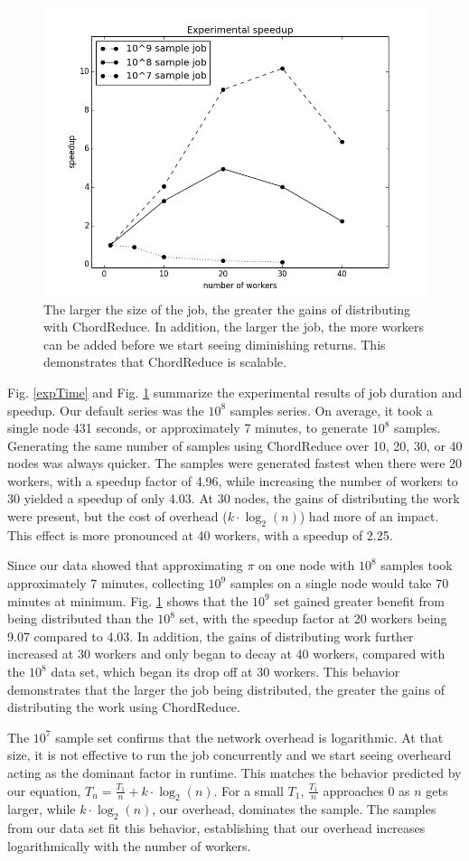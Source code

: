 \begin{figure}
    \includegraphics[width=.5\linewidth]{expSpeed}
    \caption{The larger the size of the job, the greater the gains of distributing with ChordReduce.  In addition, the larger the job, the more workers can be added before we start seeing diminishing returns.  This demonstrates that ChordReduce is scalable.}
    \label{expSpeed}
\end{figure}

Fig. \ref{expTime} and Fig. \ref{expSpeed} summarize the experimental results of job duration and speedup.  Our default series was the $10^{8}$ samples series.  On average, it took a single node 431 seconds, or approximately 7 minutes, to generate $10^{8}$ samples.  Generating the same number of samples using ChordReduce over 10, 20, 30, or 40 nodes was always quicker.  The samples were generated fastest when there were 20 workers, with a speedup factor of 4.96, while increasing the number of workers to 30 yielded a speedup of only 4.03.  At 30 nodes, the gains of distributing the work were present, but the cost of overhead ($k \cdot \log_{2}(n)$) had more of an impact.  This effect is more pronounced at 40 workers, with a speedup of 2.25.

Since our data showed that approximating $\pi$ on one node with $10^{8}$ samples took approximately 7 minutes, collecting $10^{9}$ samples on a single node would take 70 minutes at minimum.  Fig. \ref{expSpeed} shows that the $10^{9}$ set gained greater benefit from being distributed than the $10^{8}$ set, with the speedup factor at 20 workers being 9.07 compared to 4.03.  In addition, the gains of distributing work further increased at 30 workers and only began to decay at 40 workers, compared with the $10^{8}$ data set, which began its drop off at 30 workers. This behavior demonstrates that the larger the job being distributed, the greater the gains of distributing the work using ChordReduce.

The $10^{7}$ sample set confirms that the network overhead is logarithmic.  At that size, it is not effective to run the job concurrently and we start seeing overheard acting as the dominant factor in runtime.  This matches the behavior predicted by our equation, $T_{n} = \frac{T_{1}}{n} + k \cdot \log_{2}(n)$. For a small $T_{1}$, $\frac{T_{1}}{n}$  approaches 0 as $n$ gets larger, while $k \cdot \log_{2}(n)$, our overhead, dominates the sample.  The samples from our data set fit this behavior, establishing that our overhead increases logarithmically with the number of workers.


